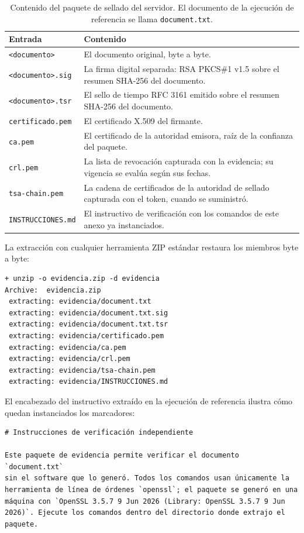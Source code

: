 \begin{table}[H]
  \centering
  \caption{Contenido del paquete de sellado del servidor. El documento de la ejecución de referencia se llama \texttt{document.txt}.}
  \label{tab:verificacion-contenido}
  \begin{tabularx}{\linewidth}{@{}l X@{}}
    \toprule
    \textbf{Entrada} & \textbf{Contenido} \\
    \midrule
    \texttt{<documento>} & El documento original, byte a byte. \\
    \texttt{<documento>.sig} & La firma digital separada: RSA PKCS\#1 v1.5 sobre el resumen SHA-256 del documento. \\
    \texttt{<documento>.tsr} & El sello de tiempo RFC 3161 emitido sobre el resumen SHA-256 del documento. \\
    \texttt{certificado.pem} & El certificado X.509 del firmante. \\
    \texttt{ca.pem} & El certificado de la autoridad emisora, raíz de la confianza del paquete. \\
    \texttt{crl.pem} & La lista de revocación capturada con la evidencia; su vigencia se evalúa según sus fechas. \\
    \texttt{tsa-chain.pem} & La cadena de certificados de la autoridad de sellado capturada con el token, cuando se suministró. \\
    \texttt{INSTRUCCIONES.md} & El instructivo de verificación con los comandos de este anexo ya instanciados. \\
    \bottomrule
  \end{tabularx}
\end{table}

La extracción con cualquier herramienta ZIP estándar restaura los miembros byte a byte:

\begin{lstlisting}[numbers=none]
+ unzip -o evidencia.zip -d evidencia
Archive:  evidencia.zip
 extracting: evidencia/document.txt
 extracting: evidencia/document.txt.sig
 extracting: evidencia/document.txt.tsr
 extracting: evidencia/certificado.pem
 extracting: evidencia/ca.pem
 extracting: evidencia/crl.pem
 extracting: evidencia/tsa-chain.pem
 extracting: evidencia/INSTRUCCIONES.md
\end{lstlisting}

El encabezado del instructivo extraído en la ejecución de referencia ilustra cómo quedan instanciados los marcadores:

\begin{lstlisting}[numbers=none]
# Instrucciones de verificación independiente

Este paquete de evidencia permite verificar el documento `document.txt`
sin el software que lo generó. Todos los comandos usan únicamente la
herramienta de línea de órdenes `openssl`; el paquete se generó en una
máquina con `OpenSSL 3.5.7 9 Jun 2026 (Library: OpenSSL 3.5.7 9 Jun
2026)`. Ejecute los comandos dentro del directorio donde extrajo el
paquete.
\end{lstlisting}

